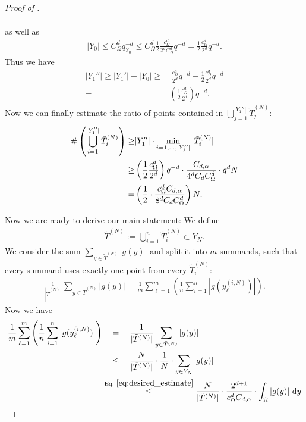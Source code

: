 \documentclass[a4paper, 10pt]{article}
\begin{document}
\begin{proof}[Proof of ]
\begin{itemize}
\begin{align*}
%
\end{align*}
as well as
\begin{align*}
|Y_0| \leq C_\Omega^d q_{Y_0}^{-d} \leq C_\Omega^d \frac{1}{2} \frac{c_\Omega^d}{2^d C_\Omega^d} q^{-d} 
= \frac{1}{2} \frac{c_\Omega^d}{2^d} q^{-d}.
\end{align*}
Thus we have
\begin{align*}
|Y_1''| \geq |Y_1'| - |Y_0| \geq& ~ \frac{c_\Omega^d}{2^d} q^{-d} - \frac{1}{2} \frac{c_\Omega^d}{2^d} q^{-d} \\
=& \left( \frac{1}{2} \frac{c_\Omega^d}{2^d} \right) q^{-d}.
\end{align*}
Now we can finally estimate the ratio of points contained in $\bigcup_{j=1}^{|Y_1''|} \tilde{T}_j^{(N)}$:
\begin{align}
\label{eq:subset_size_ratio}
\# \left( \bigcup_{i=1}^{|Y_1''|} \tilde{T}_i^{(N)} \right) \geq& |Y_1''| \cdot \min_{i=1, ..., |Y_1''|} | \tilde{T}_i^{(N)} | \notag \\
\geq& \left( \frac{1}{2} \frac{c_\Omega^d}{2^d} \right) q^{-d} \cdot \frac{C_{d, \alpha}}{4^d C_d C_\Omega^d} \cdot q^d N \notag \\
=& \left( \frac{1}{2} \cdot \frac{c_\Omega^d C_{d, \alpha}}{8^d C_d C_\Omega^d} \right)  N.
\end{align}
\end{itemize}
Now we are ready to derive our main statement:
We define
\begin{align*}
\tilde{T}^{(N)} := \bigcup_{i=1}^n \tilde{T}_i^{(N)} \subset Y_N.
\end{align*}
We consider the sum $\sum_{y \in \tilde{T}^{(N)}} |g(y)|$ and split it into $m$ summands, such that every summand uses exactly one point from every $\tilde{T}_i^{(N)}$:
\begin{align*}
\frac{1}{|\tilde{T}^{(N)}|} \sum_{y \in \tilde{T}^{(N)}} |g(y)|
= \frac{1}{m} \sum_{\ell = 1}^m \left( \frac{1}{n} \sum_{i=1}^n |g(y_{\ell}^{(i, N)})| \right).
\end{align*}
Now we have
\begin{align*}
\frac{1}{m} \sum_{\ell = 1}^m \left( \frac{1}{n} \sum_{i=1}^n |g(y_{\ell}^{(i, N)})| \right) 
&~~~=~~~ \frac{1}{|\tilde{T}^{(N)}|} \sum_{y \in \tilde{T}^{(N)}} |g(y)| \\
%
&~~~\leq~~~ \frac{N}{|\tilde{T}^{(N)}|} \cdot \frac{1}{N} \cdot \sum_{y \in Y_N} |g(y)| \\
&\stackrel{\text{Eq.\ }\eqref{eq:desired_estimate}}{\leq} \frac{N}{|\tilde{T}^{(N)}|} \cdot \frac{2^{d+1}}{c_\Omega^{d} C_{d, \alpha}} \cdot \int_{\Omega} |g(y)| ~ \mathrm{d}y \\ 

\end{align*}
\end{proof}
\end{document}
